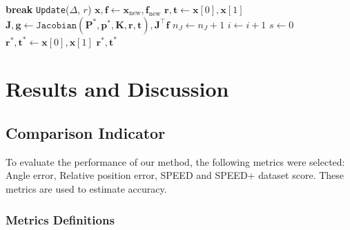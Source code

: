 \documentclass[a4paper,fleqn]{cas-sc}
\begin{document}
\begin{algorithm}
\begin{algorithmic}[1]
		\STATE \textbf{break}
		\ENDIF
		\STATE \texttt{Update}($\Delta$, $r$)
		\ENDWHILE
		\STATE $\mathbf{x}, \mathbf{f} \gets \mathbf{x}_{\text{new}}, \mathbf{f}_{\text{new}}$
		\STATE $\mathbf{r}, \mathbf{t} \gets \mathbf{x}[0], \mathbf{x}[1]$
		\STATE $\mathbf{J}, \mathbf{g} \gets \texttt{Jacobian}(\mathbf{P}^*, \mathbf{p}^*, \mathbf{K}, \mathbf{r}, \mathbf{t}), \mathbf{J}^\top \mathbf{f}$
		\STATE $n_J \gets n_J + 1$
		\ENDIF
		\STATE $i \gets i + 1$
		\ENDWHILE
		\STATE $s \gets 0$
		\ENDIF
		\STATE $\mathbf{r}^*, \mathbf{t}^* \gets \mathbf{x}[0], \mathbf{x}[1]$
		\RETURN $\mathbf{r}^*, \mathbf{t}^*$
	\end{algorithmic}
\end{algorithm}


\section{Results and Discussion} \label{sec:experiments}

\subsection{Comparison Indicator}

To evaluate the performance of our method, the following metrics were selected: Angle error, Relative position error, SPEED and SPEED+ dataset score. These metrics are used to estimate accuracy.

\subsubsection{Metrics Definitions}
\end{document}
